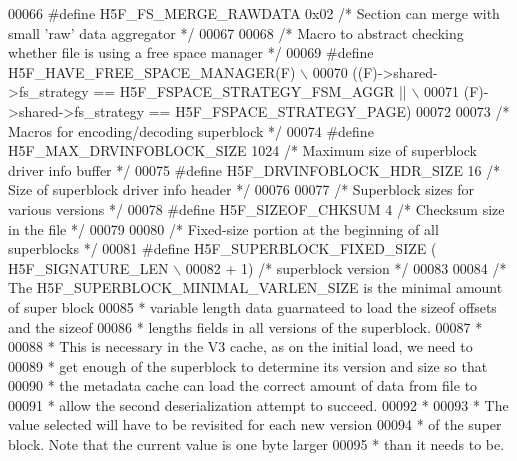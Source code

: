 \begin{DoxyCode}
00066 \textcolor{preprocessor}{#define H5F\_FS\_MERGE\_RAWDATA            0x02    }\textcolor{comment}{/* Section can merge with small 'raw' data aggregator */}\textcolor{preprocessor}{}
00067 
00068 \textcolor{comment}{/* Macro to abstract checking whether file is using a free space manager */}
00069 \textcolor{preprocessor}{#define H5F\_HAVE\_FREE\_SPACE\_MANAGER(F)  \(\backslash\)}
00070 \textcolor{preprocessor}{    ((F)->shared->fs\_strategy == H5F\_FSPACE\_STRATEGY\_FSM\_AGGR ||                        \(\backslash\)}
00071 \textcolor{preprocessor}{     (F)->shared->fs\_strategy == H5F\_FSPACE\_STRATEGY\_PAGE)}
00072 
00073 \textcolor{comment}{/* Macros for encoding/decoding superblock */}
00074 \textcolor{preprocessor}{#define H5F\_MAX\_DRVINFOBLOCK\_SIZE  1024         }\textcolor{comment}{/* Maximum size of superblock driver info buffer */}\textcolor{preprocessor}{}
00075 \textcolor{preprocessor}{#define H5F\_DRVINFOBLOCK\_HDR\_SIZE 16            }\textcolor{comment}{/* Size of superblock driver info header */}\textcolor{preprocessor}{}
00076 
00077 \textcolor{comment}{/* Superblock sizes for various versions */}
00078 \textcolor{preprocessor}{#define H5F\_SIZEOF\_CHKSUM 4     }\textcolor{comment}{/* Checksum size in the file */}\textcolor{preprocessor}{}
00079 
00080 \textcolor{comment}{/* Fixed-size portion at the beginning of all superblocks */}
00081 \textcolor{preprocessor}{#define H5F\_SUPERBLOCK\_FIXED\_SIZE ( H5F\_SIGNATURE\_LEN                   \(\backslash\)}
00082 \textcolor{preprocessor}{        + 1) }\textcolor{comment}{/* superblock version */}\textcolor{preprocessor}{}
00083 
00084 \textcolor{comment}{/* The H5F\_SUPERBLOCK\_MINIMAL\_VARLEN\_SIZE is the minimal amount of super block}
00085 \textcolor{comment}{ * variable length data guarnateed to load the sizeof offsets and the sizeof }
00086 \textcolor{comment}{ * lengths fields in all versions of the superblock.}
00087 \textcolor{comment}{ *}
00088 \textcolor{comment}{ * This is necessary in the V3 cache, as on the initial load, we need to }
00089 \textcolor{comment}{ * get enough of the superblock to determine its version and size so that}
00090 \textcolor{comment}{ * the metadata cache can load the correct amount of data from file to }
00091 \textcolor{comment}{ * allow the second deserialization attempt to succeed.}
00092 \textcolor{comment}{ *}
00093 \textcolor{comment}{ * The value selected will have to be revisited for each new version }
00094 \textcolor{comment}{ * of the super block.  Note that the current value is one byte larger}
00095 \textcolor{comment}{ * than it needs to be. }

\end{DoxyCode}
